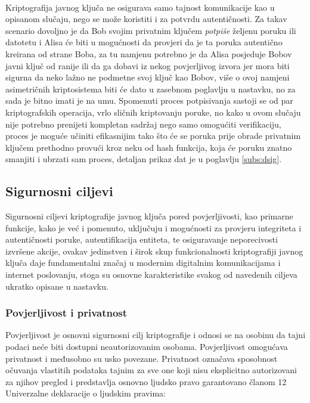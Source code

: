 \paragraph*{}
Kriptografija javnog ključa ne osigurava samo tajnost komunikacije kao u opisanom slučaju, nego se može koristiti i za potvrdu autentičnosti. Za takav scenario dovoljno je da Bob svojim privatnim ključem \textit{potpiše} željenu poruku ili datotetu i Alisa će biti u mogućnosti da provjeri da je ta poruka autentično kreirana od strane Boba, za tu namjenu potrebno je da Alisa posjeduje Bobov javni ključ od ranije ili da ga dobavi iz nekog povjerljivog izvora jer mora biti sigurna da neko lažno ne podmetne svoj ključ kao Bobov, više o ovoj namjeni asimetričnih kriptosistema biti će dato u zasebnom poglavlju u nastavku, no za sada je bitno imati je na umu. Spomenuti proces potpisivanja sastoji se od par kriptografskih operacija, vrlo sličnih kriptovanju poruke, no kako u ovom slučaju nije potrebno prenijeti kompletan sadržaj nego samo omogućiti verifikaciju, proces je moguće učiniti efikasnijim tako što će se poruka prije obrade privatnim ključem prethodno provući kroz neku od hash funkcija, koja će poruku znatno smanjiti i ubrzati sam proces, detaljan prikaz dat je u poglavlju \ref{subs:dsig}.

\subsection{Sigurnosni ciljevi}
Sigurnosni ciljevi kriptografije javnog ključa pored povjerljivosti, kao primarne funkcije, kako je već i pomenuto, uključuju i mogućnosti za provjeru integriteta i autentičnosti poruke, autentifikacija entiteta, te osiguravanje neporecivosti izvršene akcije\cite{buchmann2013introduction}, ovakav jedinstven i širok skup funkcionalnosti kriptografiji javnog ključa daje fundamentalni značaj u modernim digitalnim komunikacijama i internet poslovanju, stoga su osnovne karakteristike svakog od navedenih ciljeva ukratko opisane u nastavku.

\subsubsection*{Povjerljivost i privatnost}
Povjerljivost je osnovni sigurnosni cilj kriptografije i odnosi se na osobinu da tajni podaci neće biti dostupni neautorizovanim osobama. Povjerljivost omogućava privatnost i međusobno su usko povezane. Privatnost označava sposobnost očuvanja vlastitih podataka tajnim za sve one koji nisu eksplicitno autorizovani za njihov pregled i predstavlja osnovno ljudsko pravo garantovano članom 12 Univerzalne deklaracije o ljudskim pravima\cite{assembly1948universal}:

